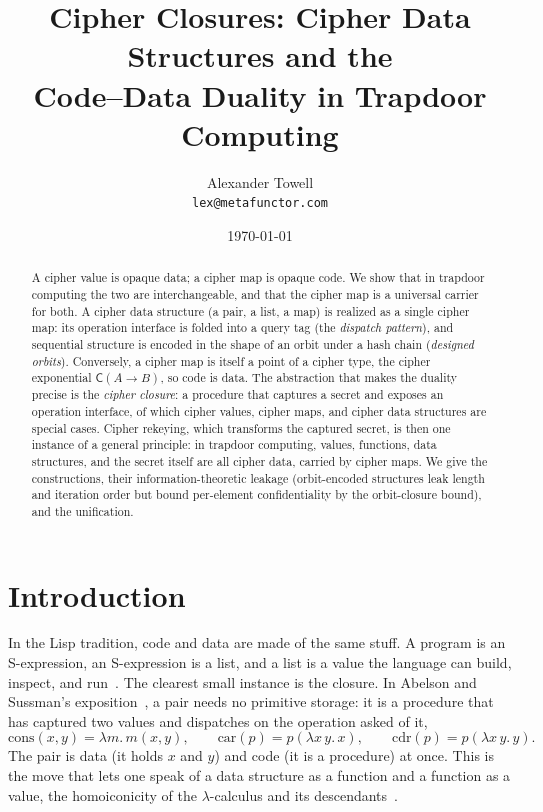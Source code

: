 \documentclass[11pt]{article}
\title{Cipher Closures: Cipher Data Structures and the\\
Code--Data Duality in Trapdoor Computing}
\author{Alexander Towell\\\texttt{lex@metafunctor.com}}
\date{\today}
\theoremstyle{definition}
\theoremstyle{plain}
\theoremstyle{definition}
\theoremstyle{remark}
\newcommand{\cipher}[1]{\mathsf{C}(#1)}
\begin{document}
\maketitle

\begin{abstract}
A cipher value is opaque data; a cipher map is opaque code. We show
that in trapdoor computing the two are interchangeable, and that the
cipher map is a universal carrier for both. A cipher data structure
(a pair, a list, a map) is realized as a single cipher map: its
operation interface is folded into a query tag (the \emph{dispatch
pattern}), and sequential structure is encoded in the shape of an
orbit under a hash chain (\emph{designed orbits}). Conversely, a
cipher map is itself a point of a cipher type, the cipher exponential
$\cipher{A \to B}$, so code is data. The abstraction that makes the
duality precise is the \emph{cipher closure}: a procedure that
captures a secret and exposes an operation interface, of which cipher
values, cipher maps, and cipher data structures are special cases.
Cipher rekeying, which transforms the captured secret, is then one
instance of a general principle: in trapdoor computing, values,
functions, data structures, and the secret itself are all cipher
data, carried by cipher maps. We give the constructions, their
information-theoretic leakage (orbit-encoded structures leak length
and iteration order but bound per-element confidentiality by the
orbit-closure bound), and the unification.
\end{abstract}

\section{Introduction}
\label{sec:intro}

In the Lisp tradition, code and data are made of the same stuff. A
program is an S-expression, an S-expression is a list, and a list is a
value the language can build, inspect, and run~\cite{mccarthy1960recursive}.
The clearest small instance is the closure. In Abelson and Sussman's
exposition~\cite{abelson1996sicp}, a pair needs no primitive storage:
it is a procedure that has captured two values and dispatches on the
operation asked of it,
\[
\mathrm{cons}(x, y) = \lambda m.\, m(x, y),\qquad
\mathrm{car}(p) = p(\lambda x\, y.\, x),\qquad
\mathrm{cdr}(p) = p(\lambda x\, y.\, y).
\]
The pair is data (it holds $x$ and $y$) and code (it is a procedure)
at once. This is the move that lets one speak of a data structure as a
function and a function as a value, the homoiconicity of the
$\lambda$-calculus and its descendants~\cite{landin1964mechanical}.
\end{document}
